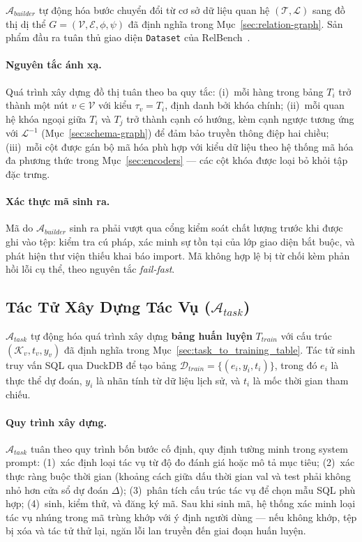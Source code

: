 $\mathcal{A}_{builder}$ tự động hóa bước chuyển đổi từ cơ sở dữ liệu quan hệ $(\mathcal{T}, \mathcal{L})$ sang đồ thị dị thể $G=(\mathcal{V},\mathcal{E},\phi,\psi)$ đã định nghĩa trong Mục~\ref{sec:relation-graph}. Sản phẩm đầu ra tuân thủ giao diện \texttt{Dataset} của RelBench~\cite{robinson2024relbench}.

\paragraph{Nguyên tắc ánh xạ.}
Quá trình xây dựng đồ thị tuân theo ba quy tắc: (i)~mỗi hàng trong bảng $T_i$ trở thành một nút $v \in \mathcal{V}$ với kiểu $\tau_v = T_i$, định danh bởi khóa chính; (ii)~mỗi quan hệ khóa ngoại giữa $T_i$ và $T_j$ trở thành cạnh có hướng, kèm cạnh ngược tương ứng với $\mathcal{L}^{-1}$ (Mục~\ref{sec:schema-graph}) để đảm bảo truyền thông điệp hai chiều; (iii)~mỗi cột được gán bộ mã hóa phù hợp với kiểu dữ liệu theo hệ thống mã hóa đa phương thức trong Mục~\ref{sec:encoders} --- các cột khóa được loại bỏ khỏi tập đặc trưng.

\paragraph{Xác thực mã sinh ra.}
Mã do $\mathcal{A}_{builder}$ sinh ra phải vượt qua cổng kiểm soát chất lượng trước khi được ghi vào tệp: kiểm tra cú pháp, xác minh sự tồn tại của lớp giao diện bắt buộc, và phát hiện thư viện thiếu khai báo import. Mã không hợp lệ bị từ chối kèm phản hồi lỗi cụ thể, theo nguyên tắc \textit{fail-fast}.

\subsection{Tác Tử Xây Dựng Tác Vụ ($\mathcal{A}_{task}$)}

$\mathcal{A}_{task}$ tự động hóa quá trình xây dựng \textbf{bảng huấn luyện} $T_{train}$ với cấu trúc $(\mathcal{K}_v, t_v, y_v)$ đã định nghĩa trong Mục~\ref{sec:task_to_training_table}. Tác tử sinh truy vấn SQL qua DuckDB để tạo bảng $\mathcal{D}_{train} = \{(e_i, y_i, t_i)\}$, trong đó $e_i$ là thực thể dự đoán, $y_i$ là nhãn tính từ dữ liệu lịch sử, và $t_i$ là mốc thời gian tham chiếu.

\paragraph{Quy trình xây dựng.}
$\mathcal{A}_{task}$ tuân theo quy trình bốn bước cố định, quy định tường minh trong system prompt: (1)~xác định loại tác vụ từ độ đo đánh giá hoặc mô tả mục tiêu; (2)~xác thực ràng buộc thời gian (khoảng cách giữa dấu thời gian val và test phải không nhỏ hơn cửa sổ dự đoán $\Delta$); (3)~phân tích cấu trúc tác vụ để chọn mẫu SQL phù hợp; (4)~sinh, kiểm thử, và đăng ký mã. Sau khi sinh mã, hệ thống xác minh loại tác vụ nhúng trong mã trùng khớp với ý định người dùng --- nếu không khớp, tệp bị xóa và tác tử thử lại, ngăn lỗi lan truyền đến giai đoạn huấn luyện.


